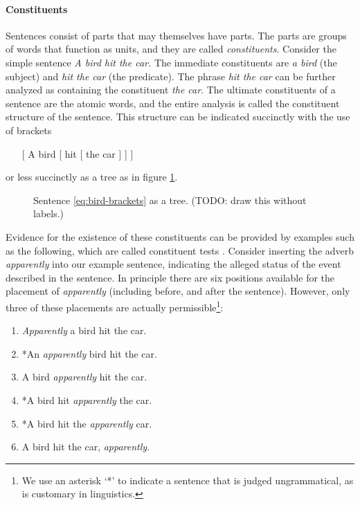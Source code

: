 \paragraph{Constituents} Sentences consist of parts that may themselves have parts. The parts are groups of words that function as units, and they are called \textit{constituents}. Consider the simple sentence \textit{A bird hit the car.} The immediate constituents are \textit{a bird} (the subject) and \textit{hit the car} (the predicate). The phrase \textit{hit the car} can be further analyzed as containing the constituent \textit{the car}. The ultimate constituents of a sentence are the atomic words, and the entire analysis is called the constituent structure of the sentence. This structure can be indicated succinctly with the use of brackets
\begin{enumerate}
  \item [ [ A bird ] [ hit [ the car ] ] ]
  \label{eq:bird-brackets}
\end{enumerate}
or less succinctly as a tree as in figure \ref{fig:bird-tree}.
\begin{figure}[h]{\textwidth}
  \center
  \caption{Sentence \ref{eq:bird-brackets} as a tree. (TODO: draw this without labels.)}
  \label{fig:bird-tree}
\end{figure}
Evidence for the existence of these constituents can be provided by examples such as the following, which are called constituent tests \citep{carnie2010constituent}. Consider inserting the adverb \textit{apparently} into our example sentence, indicating the alleged status of the event described in the sentence. In principle there are six positions available for the placement of \textit{apparently} (including before, and after the sentence). However, only three of these placements are actually permissible\footnote{We use an asterisk `*' to indicate a sentence that is judged ungrammatical, as is customary in linguistics.}:
\begin{enumerate}[noitemsep]
  \item \textit{Apparently} a bird hit the car.
  \item *An \textit{apparently} bird hit the car.
  \item A bird \textit{apparently} hit the car.
  \item *A bird hit \textit{apparently} the car.
  \item *A bird hit the \textit{apparently} car.
  \item A bird hit the car, \textit{apparently}.
\end{enumerate}
